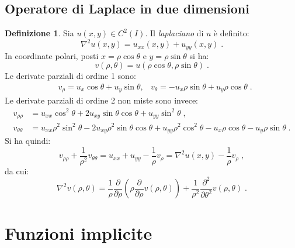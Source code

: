 \documentclass[a4paper,12pt]{report}
\theoremstyle{plain}
\theoremstyle{definition}
\newtheorem{defn}{Definizione}[section]
\theoremstyle{remark}
\numberwithin{equation}{section}
\begin{document}
\section{Operatore di Laplace in due dimensioni}
\begin{defn} Sia $u(x,y) \in C^2(I)$. Il \textit{laplaciano} di $u$ è definito:
\begin{equation}
\nabla^2 u(x,y)=u_{xx}(x,y)+u_{yy}(x,y)\;.
\end{equation}
In coordinate polari, posti $x=\rho \cos \theta$ e $y=\rho \sin \theta$ si ha:
\begin{equation}
v(\rho,\theta)=u(\rho \cos \theta, \rho\sin\theta)\;.
\end{equation}
Le derivate parziali di ordine 1 sono:
\begin{align}
&v_{\rho}=u_x\cos\theta +u_y\sin\theta, & v_{\theta}=-u_x\rho\sin\theta+u_y\rho\cos\theta\;.
\end{align}
Le derivate parziali di ordine 2 non miste sono invece:
\begin{align}
v_{\rho\rho} &= u_{xx}\cos^2\theta+2u_{xy}\sin\theta\cos\theta+u_{yy}\sin^2\theta\;, \\
v_{\theta\theta} &= u_{xx}\rho^2\sin^2\theta-2u_{xy}\rho^2\sin\theta\cos\theta+u_{yy}\rho^2\cos^2\theta-u_x\rho\cos\theta-u_y\rho\sin\theta\;.
\end{align}
Si ha quindi:
\begin{equation}
v_{\rho\rho}+\frac{1}{\rho^2}v_{\theta\theta}=u_{xx}+u_{yy}-\frac{1}{\rho}v_{\rho}=\nabla^2u(x,y)-\frac{1}{\rho}v_{\rho}\;,
\end{equation}
da cui:
\begin{equation}
\nabla^2v(\rho,\theta)=\frac{1}{\rho}\frac{\partial}{\partial \rho}\left(\rho\frac{\partial}{\partial\rho}v(\rho,\theta)\right)+
\frac{1}{\rho^2}\frac{\partial^2}{\partial\theta^2}v(\rho,\theta)\;.
\end{equation}
\end{defn}
\chapter{Funzioni implicite}
\end{document}
